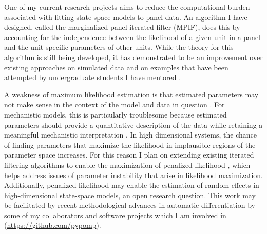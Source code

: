 \documentclass{article}
\begin{document}
One of my current research projects aims to reduce the computational burden associated with fitting state-space models to panel data.
An algorithm I have designed, called the marginalized panel iterated filter (MPIF), does this by accounting for the independence between the likelihood of a given unit in a panel and the unit-specific parameters of other units.
While the theory for this algorithm is still being developed, it has demonstrated to be an improvement over existing approaches on simulated data and on examples that have been attempted by undergraduate students I have mentored \cite{yang23,sun24}.

A weakness of maximum likelihood estimation is that estimated parameters may not make sense in the context of the model and data in question \cite{lecam90}.
For mechanistic models, this is particularly troublesome because estimated parameters should provide a quantitative description of the data while retaining a meaningful mechanistic interpretation \cite{wheeler24}.
In high dimensional systems, the chance of finding parameters that maximize the likelihood in implausible regions of the parameter space increases.
For this reason I plan on extending existing iterated filtering algorithms \cite{ionides15,ionides22} to enable the maximization of penalized likelihood \cite{cole13}, which helps address issues of parameter instability that arise in likelihood maximization.
Additionally, penalized likelihood may enable the estimation of random effects in high-dimensional state-space models, an open research question.
This work may be facilitated by recent methodological advances in automatic differentiation by some of my collaborators \cite{tan24} and software projects which I am involved in (\url{https://github.com/pypomp}).


\end{document}
